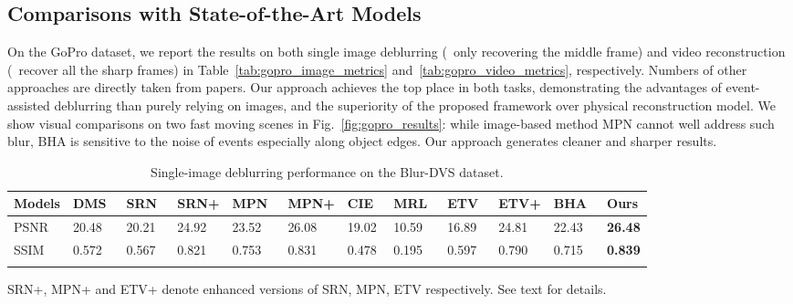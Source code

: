 \documentclass[10pt,twocolumn,letterpaper]{article}
\begin{document}
\subsection{Comparisons with State-of-the-Art Models}
On the GoPro dataset, we report the results on both single image deblurring (\ie~only recovering the middle frame) and video reconstruction (\ie~recover all the sharp frames) in Table~\ref{tab:gopro_image_metrics} and~\ref{tab:gopro_video_metrics}, respectively. Numbers of other approaches are directly taken from papers. Our approach achieves the top place in both tasks, demonstrating the advantages of event-assisted deblurring than purely relying on images, and the superiority of the proposed framework over physical reconstruction model. We show visual comparisons on two fast moving scenes in Fig.~\ref{fig:gopro_results}: while image-based method MPN cannot well address such blur, BHA is sensitive to the noise of events especially along object edges. Our approach generates cleaner and sharper results.

\begin{table*}[t!]
	\centering
	\small
	\caption{Single-image deblurring performance on the Blur-DVS dataset.}
	\begin{tabularx}{\textwidth}{p{1.05cm}<{\centering}p{1.05cm}<{\centering}p{1.05cm}<{\centering}p{1.05cm}<{\centering}p{1.05cm}<{\centering}p{1.05cm}<{\centering}p{1.05cm}<{\centering}p{1.05cm}<{\centering}p{1.05cm}<{\centering}p{1.05cm}<{\centering}p{1.05cm}<{\centering}p{1.05cm}<{\centering}}
		\toprule
		Models & DMS~\cite{NahCVPR17} & SRN~\cite{TaoCVPR18} & SRN+ & MPN~\cite{ZhangCVPR19} & MPN+  & CIE~\cite{ScheerlinckACCV18} & MRL~\cite{MundaIJCV18} & ETV~\cite{RebecqCVPR19} & ETV+ & BHA~\cite{PanCVPR19} & Ours \\
		\midrule
		PSNR & 20.48 & 20.21 & 24.92 & 23.52 & 26.08 & 19.02 & 10.59 & 16.89 & 24.81 &  22.43 & \textbf{26.48} \\
		SSIM & 0.572 & 0.567 & 0.821 & 0.753 & 0.831 & 0.478 & 0.195  & 0.597 & 0.790 & 0.715 & \textbf{0.839}  \\
		\bottomrule
		\label{tab:dvs_image_metrics}
	\end{tabularx}
	\vspace{-7mm}
	\begin{tablenotes}
		\item *SRN+, MPN+ and ETV+ denote enhanced versions of SRN, MPN, ETV respectively. See text for details.
	\end{tablenotes}
	\vspace{-3mm}
\end{table*}
\end{document}
